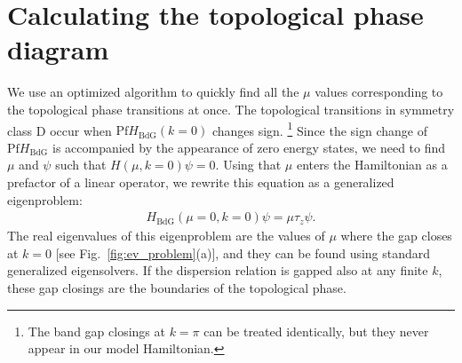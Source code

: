 \section{Calculating the topological phase diagram}


We use an optimized algorithm to quickly find all the $\mu$ values corresponding to the topological phase transitions at once.
The topological transitions in symmetry class D occur when $\textrm{Pf} H_\textrm{BdG}(k=0)$ changes sign.
\footnote{The band gap closings at $k=\pi$ can be treated identically, but they never appear in our model Hamiltonian.}
Since the sign change of $\textrm{Pf} H_\textrm{BdG}$ is accompanied by the appearance of zero energy states, we need to find $\mu$ and $\psi$ such that $H(\mu, k=0)\psi = 0$.
Using that $\mu$ enters the Hamiltonian as a prefactor of a linear operator, we rewrite this equation as a generalized eigenproblem:
\begin{eqnarray}
H_\textrm{BdG}\left(\mu=0,k=0\right)\psi=\mu\tau_z\psi.\label{eq:eigenproblem}
\end{eqnarray}
The real eigenvalues of this eigenproblem are the values of $\mu$ where the gap closes at $k=0$ [see Fig.~\ref{fig:ev_problem}(a)], and they can be found using standard generalized eigensolvers.
If the dispersion relation is gapped also at any finite $k$, these gap closings are the boundaries of the topological phase.


